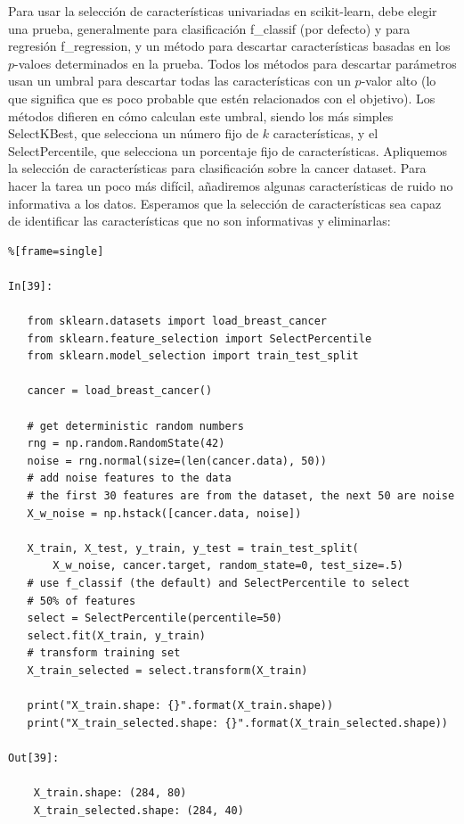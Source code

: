 Para usar la selección de características univariadas en {\ttfamily scikit-learn}, debe elegir una prueba,  \:  generalmente  para clasificación  \:  {\ttfamily f\_classif} \: (por defecto)  y  para regresión  {\ttfamily f\_regression}, y un método para descartar características basadas en los $p$-valoes  determinados en la prueba.  Todos los métodos para descartar parámetros usan un umbral para descartar todas las características con  un $p$-valor alto (lo que significa que es poco probable que estén relacionados con el objetivo). Los métodos  difieren en cómo calculan este umbral, siendo los más simples {\ttfamily SelectKBest}, que selecciona un número fijo  de $k$  características, y el {\ttfamily SelectPercentile}, que selecciona  un porcentaje fijo de características. Apliquemos la selección de características para clasificación sobre la  cancer dataset. Para hacer la tarea un poco más difícil, añadiremos algunas características de ruido no informativa a los datos. Esperamos que la selección de características sea capaz de identificar las características que no son informativas y eliminarlas:


\begin{lstlisting}%[frame=single]

In[39]:

   from sklearn.datasets import load_breast_cancer
   from sklearn.feature_selection import SelectPercentile
   from sklearn.model_selection import train_test_split
   
   cancer = load_breast_cancer()
   
   # get deterministic random numbers
   rng = np.random.RandomState(42)
   noise = rng.normal(size=(len(cancer.data), 50))
   # add noise features to the data
   # the first 30 features are from the dataset, the next 50 are noise
   X_w_noise = np.hstack([cancer.data, noise])
   
   X_train, X_test, y_train, y_test = train_test_split(
       X_w_noise, cancer.target, random_state=0, test_size=.5)
   # use f_classif (the default) and SelectPercentile to select 
   # 50% of features 
   select = SelectPercentile(percentile=50)
   select.fit(X_train, y_train)
   # transform training set
   X_train_selected = select.transform(X_train)

   print("X_train.shape: {}".format(X_train.shape))
   print("X_train_selected.shape: {}".format(X_train_selected.shape))

Out[39]:

    X_train.shape: (284, 80)
    X_train_selected.shape: (284, 40)

\end{lstlisting}


